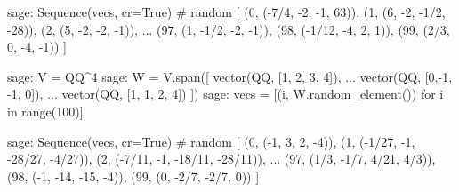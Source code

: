%
\begin{sageexample}
sage: Sequence(vecs, cr=True)          # random
[
(0, (-7/4, -2, -1, 63)),
(1, (6, -2, -1/2, -28)),
(2, (5, -2, -2, -1)),
...
(97, (1, -1/2, -2, -1)),
(98, (-1/12, -4, 2, 1)),
(99, (2/3, 0, -4, -1))
]
\end{sageexample}
%
\begin{sageexample}
sage: V = QQ^4
sage: W = V.span([ vector(QQ, [1, 2,  3, 4]),
...                vector(QQ, [0,-1, -1, 0]),
...                vector(QQ, [1, 1,  2, 4]) ])
sage: vecs = [(i, W.random_element()) for i in range(100)]
\end{sageexample}
%
\begin{sageexample}
sage: Sequence(vecs, cr=True)          # random
[
(0, (-1, 3, 2, -4)),
(1, (-1/27, -1, -28/27, -4/27)),
(2, (-7/11, -1, -18/11, -28/11)),
...
(97, (1/3, -1/7, 4/21, 4/3)),
(98, (-1, -14, -15, -4)),
(99, (0, -2/7, -2/7, 0))
]
\end{sageexample}
%
\begin{sageverbatim}
\end{sageverbatim}
%


